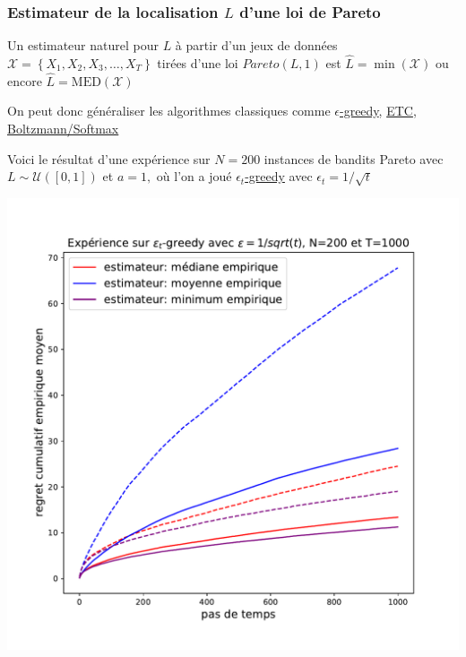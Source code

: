 \documentclass[8pt, sans]{beamer}
\begin{document}
\begin{frame}
\frametitle{Estimateur de la localisation $L$ d'une loi de Pareto}
Un estimateur naturel pour $L$ à partir d'un jeux de données $\mathcal{X}=\left\{X_1,X_2,X_3,\ldots,X_T\right\}$ tirées d'une loi $Pareto(L,1)$ est $\widehat{L}=\min(\mathcal{X})$ ou encore $\widehat{L}=\mathrm{MED}(\mathcal{X})$

\pause
\vfill

On peut donc généraliser les algorithmes classiques comme \underline{$\epsilon$-greedy}, \underline{ETC}, \underline{Boltzmann/Softmax}
  
\pause
\vfill

Voici le résultat d'une expérience sur $N=200$ instances de bandits Pareto avec $L\sim\mathcal{U}([0,1])$ et $a=1,$ où l'on a joué \underline{$\epsilon_t$-greedy} avec $\epsilon_t=1/\sqrt{t}$

\vfill

\begin{center}
\includegraphics[scale=0.3]{exp-Pareto.pdf}
\end{center}

\end{frame}
\end{document}

